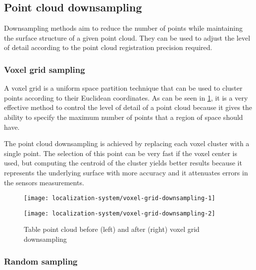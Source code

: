 \subsection{Point cloud downsampling}

Downsampling methods aim to reduce the number of points while maintaining the surface structure of a given point cloud. They can be used to adjust the level of detail according to the point cloud registration precision required.


\subsubsection{Voxel grid sampling}

A voxel grid is a uniform space partition technique that can be used to cluster points according to their Euclidean coordinates. As can be seen in \cref{fig:localization_system_voxel-grid-downsampling}, it is a very effective method to control the level of detail of a point cloud because it gives the ability to specify the maximum number of points that a region of space should have.

The point cloud downsampling is achieved by replacing each voxel cluster with a single point. The selection of this point can be very fast if the voxel center is used, but computing the centroid of the cluster yields better results because it represents the underlying surface with more accuracy and it attenuates errors in the sensors measurements.


\begin{figure}[H]
	\centering
	\begin{minipage}[h]{0.495\textwidth}
		\centering
			\texttt{[image: localization-system/voxel-grid-downsampling-1]}
	\end{minipage}\hfill
	\begin{minipage}[h]{.495\textwidth}
		\centering
	\texttt{[image: localization-system/voxel-grid-downsampling-2]}
	\end{minipage}
	\caption[Table point cloud before (left) and after (right) voxel grid downsampling]{Table point cloud before (left) and after (right) voxel grid downsampling\protect\footnotemark}
	\label{fig:localization_system_voxel-grid-downsampling}
\end{figure}



\subsubsection{Random sampling}

